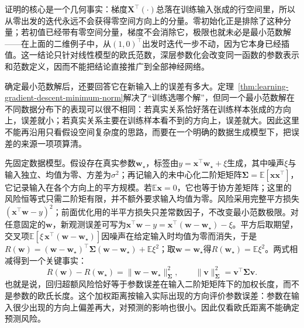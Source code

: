 证明的核心是一个几何事实：梯度$\bm X^\top(\cdot)$总落在训练输入张成的行空间里，所以从零出发的迭代永远不会获得零空间方向上的分量。零初始化正是排除了这种分量；若初值已经带有零空间分量，梯度不会消除它，极限也就未必是最小范数解——在上面的二维例子中，从$(1,0)^\top$出发时迭代一步不动，因为它本身已经插值。这一结论只针对线性模型的欧氏范数，深层参数化会改变同一函数的参数表示和范数定义，因而不能把结论直接推广到全部神经网络。

确定最小范数解后，还要回答它在新输入上的误差有多大。定理~\ref{thm:learning-gradient-descent-minimum-norm}解决了“训练选哪个解”，但同一个最小范数解在不同数据分布下的表现可以很不相同：若真实关系恰好落在训练样本张成的方向上，误差就小；若真实关系主要在训练样本看不到的方向上，误差就大。因此这里不能再沿用只看假设空间复杂度的思路，而要在一个明确的数据生成模型下，把误差的来源一项项算清。

先固定数据模型。假设存在真实参数$\bm w_\star$，标签由$y=\bm x^\top\bm w_\star+\xi$生成，其中噪声$\xi$与输入独立、均值为零、方差为$\sigma^2$；再记输入的未中心化二阶矩矩阵$\bm\Sigma=\mathbb E[\bm x\bm x^\top]$，它记录输入在各个方向上的平方规模。若$\mathbb E\bm x=0$，它也等于协方差矩阵；这里的风险恒等式只需二阶矩有限，并不额外要求输入均值为零。风险采用完整平方损失$(\bm x^\top\bm w-y)^2$；前面优化用的半平方损失只差常数因子，不改变最小范数极限。对任意固定的$\bm w$，新观测误差可写为$\bm x^\top\bm w-y=\bm x^\top(\bm w-\bm w_\star)-\xi$。平方后取期望，交叉项$\mathbb E[\xi\,\bm x^\top(\bm w-\bm w_\star)]$因噪声在给定输入时均值为零而消失，于是$R(\bm w)=(\bm w-\bm w_\star)^\top\bm\Sigma(\bm w-\bm w_\star)+\mathbb E\xi^2$；取$\bm w=\bm w_\star$得$R(\bm w_\star)=\mathbb E\xi^2$。两式相减得到一个关键事实：
\[
 R(\bm w)-R(\bm w_\star)
 =\|\bm w-\bm w_\star\|_{\bm\Sigma}^2,
 \qquad\|\bm v\|_{\bm\Sigma}^2=\bm v^\top\bm\Sigma\bm v.
\]
也就是说，回归超额风险恰好等于参数误差在输入二阶矩矩阵下的加权长度，而不是参数的欧氏长度。这个加权距离按输入实际出现的方向评价参数误差：参数在输入很少出现的方向上偏差再大，对预测的影响也很小。因此仅看欧氏距离不能确定预测风险。

